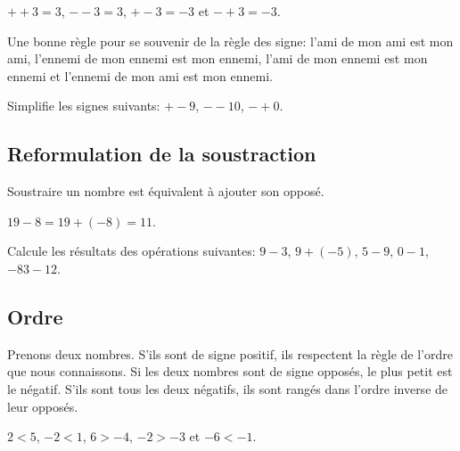 \vspace{-13mm}

\begin{exemple}
	$+ +3 = 3$, $- - 3 = 3$, $+-3 = -3$ et $-+3 = -3$.
\end{exemple}

\begin{astuce}
	Une bonne règle pour se souvenir de la règle des signe: l'ami de mon ami est mon ami, l'ennemi de mon ennemi est mon ennemi, l'ami de mon ennemi est mon ennemi et l'ennemi de mon ami est mon ennemi.
\end{astuce}

\begin{exercicefr}
	Simplifie les signes suivants: $+- 9$, $-- 10$, $-+ 0$.
\end{exercicefr}


\subsection{Reformulation de la soustraction}

\begin{propriete}
	Soustraire un nombre est équivalent à ajouter son opposé.
\end{propriete}

\begin{exemple}
	$19 - 8 = 19 + (-8) = 11$.
\end{exemple}

\begin{exercicefr}
	Calcule les résultats des opérations suivantes: $9-3$, $9+(-5)$, $5-9$, $0-1$, $-83-12$.
\end{exercicefr}



\subsection{Ordre}

\begin{propriete}
	Prenons deux nombres. S'ils sont de signe positif, ils respectent la règle de l'ordre que nous connaissons. Si les deux nombres sont de signe opposés, le plus petit est le négatif. S'ils sont tous les deux négatifs, ils sont rangés dans l'ordre inverse de leur opposés.
\end{propriete}

\begin{exemple}
	$2<5$, $-2< 1$, $6> -4$, $-2> -3$ et $-6< -1$.
\end{exemple}

